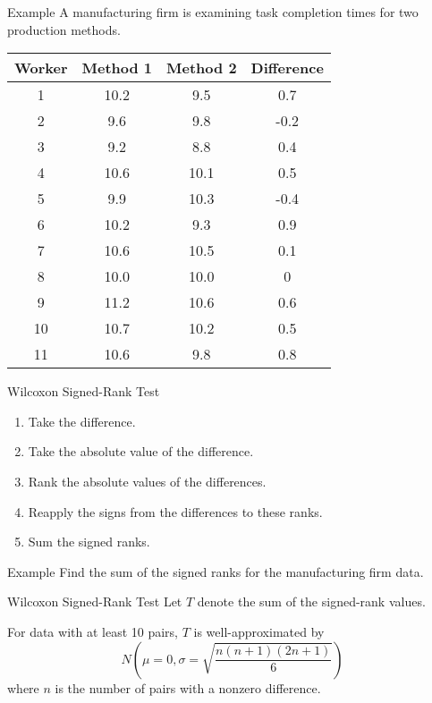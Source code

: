 \begin{frame}{Example}
    A manufacturing firm is examining task completion times for two production methods.
    \begin{table}[h]
        \centering
        \begin{tabular}{cccc}
            \hline
            Worker & Method 1 & Method 2 & Difference \\ 
            \hline
            1 & 10.2 & 9.5 & 0.7 \\
            2 & 9.6 & 9.8 & -0.2 \\
            3 & 9.2 & 8.8 & 0.4 \\
            4 & 10.6 & 10.1 & 0.5 \\
            5 & 9.9 & 10.3 & -0.4 \\
            6 & 10.2 & 9.3 & 0.9 \\
            7 & 10.6 & 10.5 & 0.1 \\
            8 & 10.0 & 10.0 & 0 \\
            9 & 11.2 & 10.6 & 0.6 \\
            10 & 10.7 & 10.2 & 0.5 \\
            11 & 10.6 & 9.8 & 0.8 \\ 
            \hline 
        \end{tabular}
    \end{table}
\end{frame}

\begin{frame}{Wilcoxon Signed-Rank Test}
    \begin{enumerate}
        \item Take the difference.
        \item Take the absolute value of the difference.
        \item Rank the absolute values of the differences.
        \item Reapply the signs from the differences to these ranks.
        \item Sum the signed ranks.
    \end{enumerate}
\end{frame}

\begin{frame}{Example}
    Find the sum of the signed ranks for the manufacturing firm data. 
\end{frame}

\begin{frame}{Wilcoxon Signed-Rank Test}
    Let $T$ denote the sum of the signed-rank values.
    
    \vspace{12pt}For data with at least 10 pairs, $T$ is well-approximated by
    \[
        N\left(\mu = 0, \sigma = \sqrt{\frac{n(n+1)(2n+1)}{6}}\right)
    \]
    where $n$ is the number of pairs with a nonzero difference. 
\end{frame}

